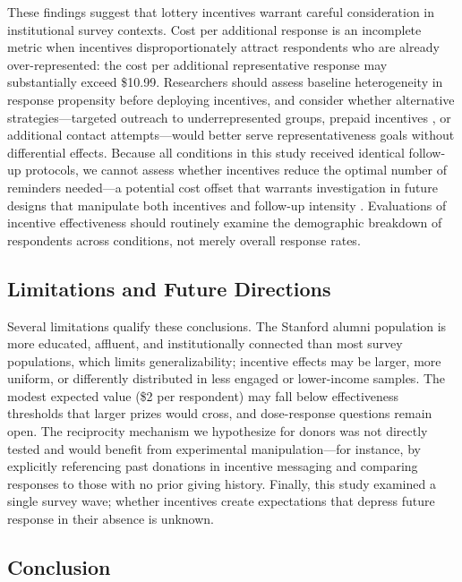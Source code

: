 These findings suggest that lottery incentives warrant careful consideration in
institutional survey contexts. Cost per additional response is an incomplete metric when
incentives disproportionately attract respondents who are already over-represented: the
cost per additional representative response may substantially exceed \$10.99. Researchers
should assess baseline heterogeneity in response propensity before deploying incentives,
and consider whether alternative strategies---targeted outreach to underrepresented
groups, prepaid incentives \parencite{Larson.Chow2003}, or additional contact
attempts---would better serve representativeness goals without differential effects.
Because all conditions in this study received identical follow-up protocols, we cannot
assess whether incentives reduce the optimal number of reminders needed---a potential
cost offset that warrants investigation in future designs that manipulate both incentives
and follow-up intensity \parencite{Olsen.etal2012}. Evaluations of incentive effectiveness
should routinely examine the demographic breakdown of respondents across conditions, not
merely overall response rates.

\subsection{Limitations and Future Directions}

Several limitations qualify these conclusions. The Stanford alumni population is more
educated, affluent, and institutionally connected than most survey populations, which
limits generalizability; incentive effects may be larger, more uniform, or differently
distributed in less engaged or lower-income samples. The modest expected value (\$2 per
respondent) may fall below effectiveness thresholds that larger prizes would cross, and
dose-response questions remain open. The reciprocity mechanism we hypothesize for donors
was not directly tested and would benefit from experimental manipulation---for instance,
by explicitly referencing past donations in incentive messaging and comparing responses
to those with no prior giving history. Finally, this study examined a single survey wave;
whether incentives create expectations that depress future response in their absence is
unknown.

\subsection{Conclusion}

